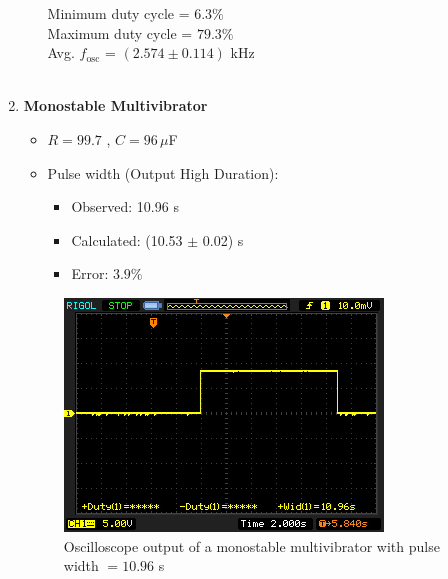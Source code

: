 \begin{enumerate}
\begin{enumerate}
\begin{table}[H]
\begin{tabular}{|c|c|c|c|c|c|}
            \end{tabular}
        \end{table}

            \noindent Minimum duty cycle = $6.3\%$\\
            Maximum duty cycle = $79.3\%$\\
            Avg. $f_\text{osc}$ = $(2.574 \pm 0.114) $ kHz\\\\
       

\end{enumerate}

\item \textbf{Monostable Multivibrator}\\

    \begin{itemize}
        \item $R=99.7$ \kohm, $C=96\,\mu$F
        \item Pulse width (Output High Duration):
            \begin{itemize}
                \item Observed: 10.96 s
                \item Calculated: (10.53 $\pm$ 0.02) s
                \item Error: $3.9\%$
            \end{itemize}
    \end{itemize}

    \begin{figure}[H]
        \centering
        \includegraphics[width=1\columnwidth]{images/monostable.png}
        \caption{Oscilloscope output of a monostable multivibrator with pulse width $=10.96$ s}
    \end{figure}


\end{enumerate}
